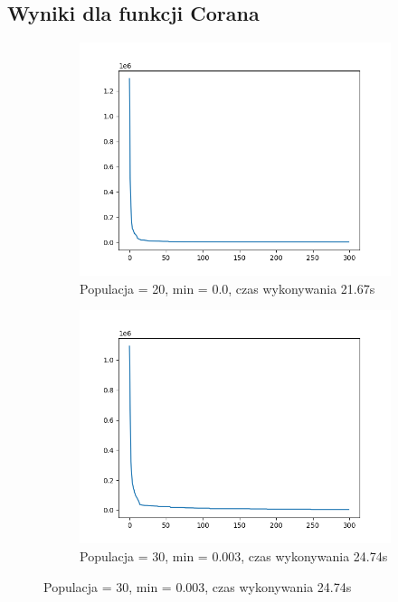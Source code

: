\documentclass[12pt]{article}
\begin{document}
\subsection{Wyniki dla funkcji Corana}
\begin{figure}[H]
    \centering
    \begin{subfigure}{0.32\textwidth}
        \centering
        \includegraphics[width=\linewidth]{plots/c1.png}
        \caption{Populacja = 20, min = 0.0, czas wykonywania 21.67s}
    \end{subfigure}
    \begin{subfigure}{0.32\textwidth}
        \centering
        \includegraphics[width=\linewidth]{plots/c2.png}
        \caption{Populacja = 30, min = 0.003, czas wykonywania 24.74s}

\end{subfigure}
\end{figure}
\end{document}

